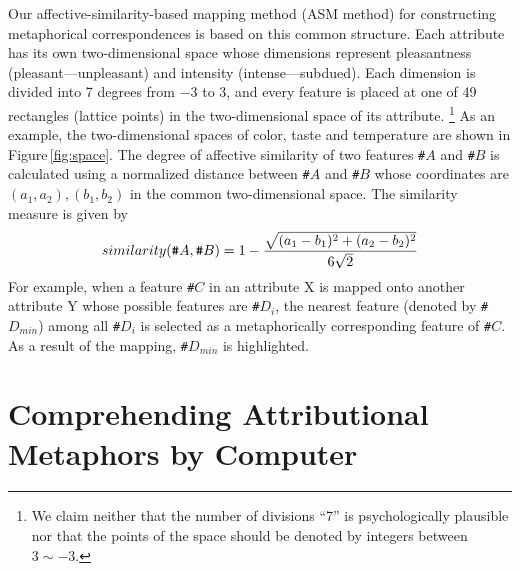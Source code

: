 Our affective-similarity-based mapping method (ASM method) for constructing
metaphorical correspondences is based on this common structure.
Each attribute has its own two-dimensional space whose dimensions represent
pleasantness (pleasant---unpleasant) and intensity (intense---subdued).
Each dimension is divided into 7 degrees from $-3$ to $3$, and 
every feature is placed at one of 49 rectangles (lattice points) in
the two-dimensional space of its attribute. 
\footnote{
  We claim neither that the number of divisions ``7'' is psychologically plausible
  nor that the points of the space should be denoted by integers between $3\sim-3$.}
As an example, the two-dimensional spaces of color, taste and temperature are shown in
Figure\,\ref{fig:space}.  
The degree of affective similarity of two features 
{\tt\#}$A$ and {\tt\#}$B$ is calculated using a normalized 
distance between {\tt\#}$A$ and {\tt\#}$B$ whose coordinates are
$(a_1,a_2),(b_1,b_2)$ in the common two-dimensional space.
The similarity measure is given by
\begin{equation}
  similarity(\mbox{\tt\#}A,\mbox{\tt\#}B) = 
  1 - \frac{\sqrt{(a_1 - b_1)^2 + (a_2 - b_2)^2}}{6\sqrt{2}} \label{eqn:distance}
\end{equation}
For example, when a feature {\tt\#}$C$ in an attribute X is mapped onto
another attribute Y whose possible features are {\tt\#}$D_i$,
the nearest feature (denoted by {\tt\#}$D_{min}$) among all {\tt\#}$D_i$ 
is selected as a metaphorically corresponding feature of {\tt\#}$C$.
As a result of the mapping, {\tt\#}$D_{min}$ is highlighted.

\section{Comprehending Attributional Metaphors by Computer}\label{sec:metaphor}
